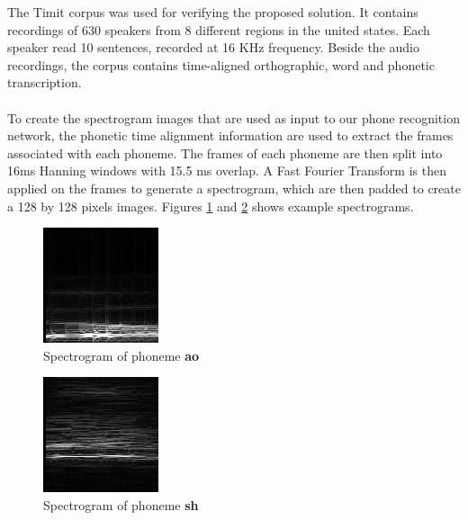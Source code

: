 The Timit corpus \cite{timit} was used for verifying the proposed solution. It contains recordings of 630 speakers from 8 different regions in the united states. Each speaker read 10 sentences, recorded at 16 KHz frequency. Beside the audio recordings, the corpus contains time-aligned orthographic, word and phonetic transcription.\\\\
To create the spectrogram images that are used as input to our phone recognition network, the phonetic time alignment information are used to extract the frames associated with each phoneme. The frames of each phoneme are then split into 16ms Hanning windows with 15.5 ms overlap. A Fast Fourier Transform is then applied on the frames to generate a spectrogram, which are then padded to create a 128 by 128 pixels images. Figures \ref{fig:spec1} and \ref{fig:spec2} shows example spectrograms.
\begin{figure}[H]
\centering
\includegraphics[width=0.6\linewidth]{figs/ao.png}
\caption{Spectrogram of phoneme \textbf{ao}}
\label{fig:spec1}
\end{figure}
\begin{figure}[H]
\centering
\includegraphics[width=0.6\linewidth]{figs/sh.png}
\caption{Spectrogram of phoneme \textbf{sh}}
\label{fig:spec2}
\end{figure}